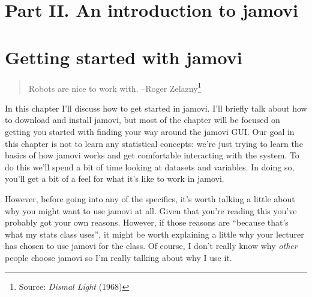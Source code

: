 \documentclass[
]{book}
\begin{document}
\hypertarget{part-ii.-an-introduction-to-jamovi}{%
\chapter*{Part II. An introduction to jamovi}\label{part-ii.-an-introduction-to-jamovi}}

\hypertarget{introj}{%
\chapter{Getting started with jamovi}\label{introj}}

\begin{quote}
Robots are nice to work with.
--Roger Zelazny\footnote{Source: \emph{Dismal Light} (1968)}
\end{quote}

In this chapter I'll discuss how to get started in jamovi. I'll briefly talk about how to download and install jamovi, but most of the chapter will be focused on getting you started with finding your way around the jamovi GUI. Our goal in this chapter is not to learn any statistical concepts: we're just trying to learn the basics of how jamovi works and get comfortable interacting with the system. To do this we'll spend a bit of time looking at datasets and variables. In doing so, you'll get a bit of a feel for what it's like to work in jamovi.

However, before going into any of the specifics, it's worth talking a little about why you might want to use jamovi at all. Given that you're reading this you've probably got your own reasons. However, if those reasons are ``because that's what my stats class uses'', it might be worth explaining a little why your lecturer has chosen to use jamovi for the class. Of course, I don't really know why \emph{other} people choose jamovi so I'm really talking about why I use it.
\end{document}
